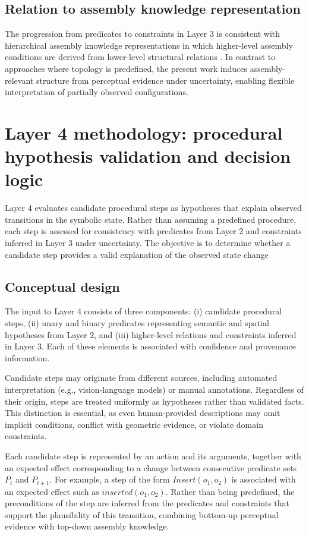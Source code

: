 \documentclass[11pt,titlepage,openright]{book}
\begin{document}
\subsection{Relation to assembly knowledge representation}

The progression from predicates to constraints in Layer 3 is consistent with hierarchical assembly knowledge representations in which higher-level assembly conditions are derived from lower-level structural relations \citep{Zhu_2022}. In contrast to approaches where topology is predefined, the present work induces assembly-relevant structure from perceptual evidence under uncertainty, enabling flexible interpretation of partially observed configurations.


\section{Layer 4 methodology: procedural hypothesis validation and decision logic}
\label{sec:layer4-method}

Layer 4 evaluates candidate procedural steps as hypotheses that explain observed transitions in the symbolic state. Rather than assuming a predefined procedure, each step is assessed for consistency with predicates from Layer 2 and constraints inferred in Layer 3 under uncertainty. The objective is to determine whether a candidate step provides a valid explanation of the observed state change

\subsection{Conceptual design}

The input to Layer 4 consists of three components: (i) candidate procedural steps, (ii) unary and binary predicates representing semantic and spatial hypotheses from Layer 2, and (iii) higher-level relations and constraints inferred in Layer 3. Each of these elements is associated with confidence and provenance information.

Candidate steps may originate from different sources, including automated interpretation (e.g., vision-language models) or manual annotations. Regardless of their origin, steps are treated uniformly as hypotheses rather than validated facts. This distinction is essential, as even human-provided descriptions may omit implicit conditions, conflict with geometric evidence, or violate domain constraints.

Each candidate step is represented by an action and its arguments, together with an expected effect corresponding to a change between consecutive predicate sets $P_t$ and $P_{t+1}$. For example, a step of the form $Insert(o_1, o_2)$ is associated with an expected effect such as $inserted(o_1, o_2)$. Rather than being predefined, the preconditions of the step are inferred from the predicates and constraints that support the plausibility of this transition, combining bottom-up perceptual evidence with top-down assembly knowledge.
\end{document}
